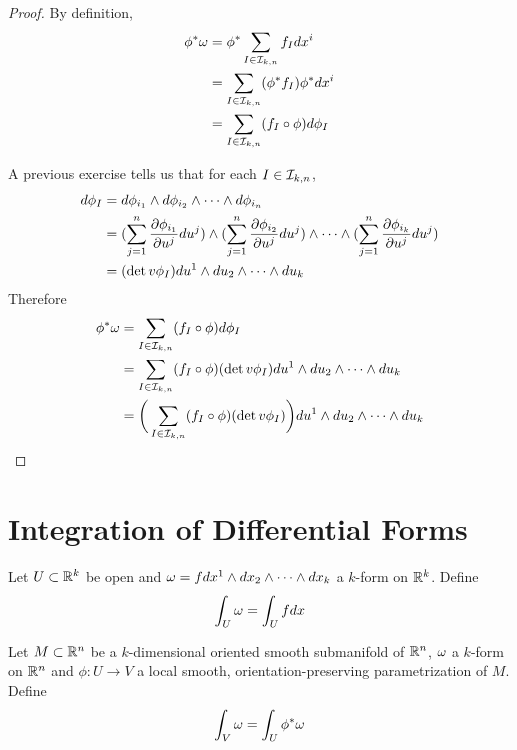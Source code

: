 \documentclass{book}
\begin{document}
	\begin{proof}
		By definition,  
		\begin{align*}
			\phi^* \omega 
			& = \phi^*  \sum_{I \in \mathcal{I}_{k,n}} f_Idx^i \\
			& = \sum_{I \in \mathcal{I}_{k,n}} (\phi^*f_I) \phi^*dx^i \\
			& = \sum_{I \in \mathcal{I}_{k,n}} (f_I \circ  \phi)  d\phi_I
		\end{align*}
	
	A previous exercise tells us that for each $I \in \mathcal{I}_{k,n}$,
	\begin{align*}
		d \phi_I 
		& = d\phi_{i_1} \wedge d\phi_{i_2} \wedge \cdots \wedge d \phi_{i_n} \\
		& = (\sum_{j = 1}^n \frac{\partial \phi_{i_1}}{\partial u^j} du^j) \wedge (\sum_{j = 1}^n \frac{\partial \phi_{i_2}}{\partial u^j} du^j) \wedge \cdots \wedge (\sum_{j = 1}^n\frac{\partial \phi_{i_k}}{\partial u^j}du^j)   \\
		& = (\det v\phi_I)du^1 \wedge du_2 \wedge \cdots \wedge du_k
	\end{align*}
	Therefore 
	\begin{align*}
		\phi^* \omega
		& = \sum_{I \in \mathcal{I}_{k,n}} (f_I \circ  \phi)  d\phi_I \\
		& = \sum_{I \in \mathcal{I}_{k,n}} (f_I \circ  \phi)  (\det v\phi_I)du^1 \wedge du_2 \wedge \cdots \wedge du_k \\
		& = \bigg(\sum_{I \in \mathcal{I}_{k,n}} (f_I \circ  \phi)  (\det v\phi_I)\bigg)du^1 \wedge du_2 \wedge \cdots \wedge du_k
	\end{align*}
	\end{proof}
	
	\section{Integration of Differential Forms}
	
	\begin{defn}
		Let $U \subset \mathbb{R}^k$ be open and $\omega = f dx^1 \wedge dx_2 \wedge \cdots \wedge dx_k$ a $k$-form on $\mathbb{R}^k$. Define $$\int_U \omega = \int_U f dx$$
	\end{defn}
	
	\begin{defn}
		Let $M \subset \mathbb{R}^n$ be a $k$-dimensional oriented smooth submanifold of $\mathbb{R}^n$, $\omega$ a $k$-form on $\mathbb{R}^n$ and $\phi: U \rightarrow V$ a local smooth, orientation-preserving parametrization of $M$. Define $$\int_V \omega = \int_U \phi^*\omega $$
	\end{defn} 
\end{document}
